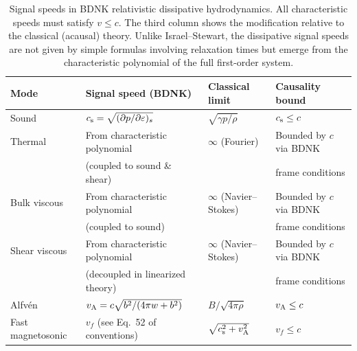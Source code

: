 \begin{table}[htbp]
\centering
\caption{Signal speeds in BDNK relativistic dissipative hydrodynamics.
  All characteristic speeds must satisfy $v \le c$.  The third column shows the
  modification relative to the classical (acausal) theory.  Unlike Israel--Stewart,
  the dissipative signal speeds are not given by simple formulas involving
  relaxation times but emerge from the characteristic polynomial of the full
  first-order system.}
\label{tab:causality-bounds}
\begin{tabular}{llll}
\hline\hline
\textbf{Mode} & \textbf{Signal speed (BDNK)} & \textbf{Classical limit} &
  \textbf{Causality bound} \\
\hline
Sound &
  $c_{\mathrm{s}} = \sqrt{(\partial p/\partial\varepsilon)_{s}}$ &
  $\sqrt{\gamma p/\rho}$ &
  $c_{\mathrm{s}} \le c$ \\[4pt]
Thermal &
  From characteristic polynomial &
  $\infty$ (Fourier) &
  Bounded by $c$ via BDNK \\[2pt]
  &
  (coupled to sound \& shear) &
  &
  frame conditions \\[4pt]
Bulk viscous &
  From characteristic polynomial &
  $\infty$ (Navier--Stokes) &
  Bounded by $c$ via BDNK \\[2pt]
  &
  (coupled to sound) &
  &
  frame conditions \\[4pt]
Shear viscous &
  From characteristic polynomial &
  $\infty$ (Navier--Stokes) &
  Bounded by $c$ via BDNK \\[2pt]
  &
  (decoupled in linearized theory) &
  &
  frame conditions \\[4pt]
Alfv\'en &
  $v_{\mathrm{A}} = c\sqrt{b^{2}/(4\pi w + b^{2})}$ &
  $B/\sqrt{4\pi\rho}$ &
  $v_{\mathrm{A}} \le c$ \\[4pt]
Fast magnetosonic &
  $v_{f}$ (see Eq.~52 of conventions) &
  $\sqrt{c_{\mathrm{s}}^{2}+v_{\mathrm{A}}^{2}}$ &
  $v_{f} \le c$ \\
\hline\hline
\end{tabular}
\end{table}

